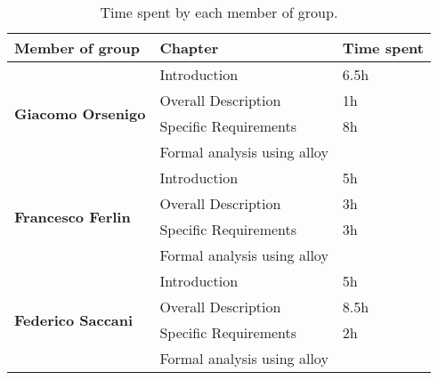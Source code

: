 \begin{table}[H]
    \centering
    \begin{tabular}{|l|l|l|}
        \hline
        \textbf{Member of group }                  & \textbf{Chapter}            & \textbf{Time spent} \\\hline
        \multirow{4}{*}{\textbf{Giacomo Orsenigo}} & Introduction                & 6.5h                \\
                                                   & Overall Description         & 1h                  \\
                                                   & Specific Requirements       & 8h                  \\
                                                   & Formal analysis using alloy &                     \\\hline
        \multirow{4}{*}{\textbf{Francesco Ferlin}} & Introduction                & 5h                  \\
                                                   & Overall Description         & 3h                  \\
                                                   & Specific Requirements       & 3h                  \\
                                                   & Formal analysis using alloy &                     \\\hline
        \multirow{4}{*}{\textbf{Federico Saccani}} & Introduction                & 5h                  \\
                                                   & Overall Description         & 8.5h                \\
                                                   & Specific Requirements       & 2h                  \\
                                                   & Formal analysis using alloy &                     \\\hline
    \end{tabular}
    \caption{Time spent by each member of group.}
    \label{table:Time spent}
\end{table}
